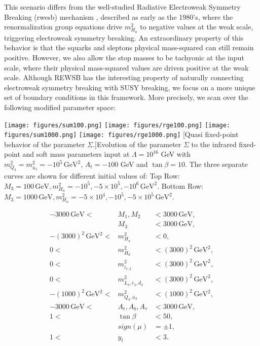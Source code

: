 This scenario differs from the well-studied Radiative Electroweak Symmetry Breaking (\acrshort{rwesb}) mechanism \cite{RN563,RN903,RN904,RN905,RN907}, described as early as the 1980's, where the renormalization group equations drive $m^2_{H_u}$ to negative values at the weak scale, triggering electroweak symmetry breaking. An extraordinary property of this behavior is that the squarks and sleptons physical mass-squared can still remain positive. However, we also allow the stop masses to be tachyonic at the input scale, where their physical mass-squared values are driven positive at the weak scale. Although REWSB has the interesting property of naturally connecting electroweak symmetry breaking with SUSY breaking, we focus on a more unique set of boundary conditions in this framework. More precisely, we scan over the following modified parameter space:
\begin{center}
	\texttt{[image: figures/sum100.png]}
	\texttt{[image: figures/rge100.png]}
	\texttt{[image: figures/sum1000.png]}
	\texttt{[image: figures/rge1000.png]}
	[Quasi fixed-point behavior of the parameter $\Sigma$.]{Evolution of the parameter $\Sigma$ to the infrared fixed-point and soft mass parameters input at $\Lambda=10^{16}$ GeV with $m^2_{Q_3}=m^2_{\bar{u}_3}=-10^5\,\text{GeV}^2$, $A_t=-100$ GeV and $\tan \beta=10$. The three separate curves are shown for different initial values of: Top Row: $M_3=100\,\text{GeV},m^2_{H_u}=-10^5, -5\times 10^5, -10^6\, \text{GeV}^2$. Bottom Row: $M_3=1000\,\text{GeV},m^2_{H_u}=-5\times10^4, -10^5, -5\times10^5\, \text{GeV}^2$.}
	\label{fig:rgeplots}
\end{center}
\begin{eqnarray}
-3000\,\text{GeV} <& M_1,M_2 &< 3000\,\text{GeV}, \nonumber \\
&M_3 &< 3000\,\text{GeV}, \nonumber \\
-(3000)^2\,\text{GeV}^2 <& m^2_{H_u} &< 0, \nonumber \\
0 <& m^2_{H_d} &< (3000)^2\,\text{GeV}^2, \nonumber \\
0<& m^2_{i_{1,2}} &< (3000)^2 \,\text{GeV}^2, \nonumber \\
0<& m^2_{L_{3},\bar{e}_{3},\bar{d}_{3}} &< (3000)^2 \,\text{GeV}^2, \nonumber \\
-(1000)^2 \,\text{GeV}^2 <& m^2_{Q_{3},\bar{u}_{3}} &< (1000)^2 \,\text{GeV}^2, \nonumber \\
-3000\,\text{GeV} <& A_t,A_b,A_{\tau} &< 3000\,\text{GeV}, \nonumber \\
1 <& \tan \beta &< 50, \nonumber \\
&sign(\mu)&=\pm 1, \nonumber\\
1 <& y_t &< 3.
\end{eqnarray}
